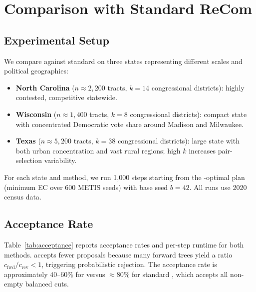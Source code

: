 \section{Comparison with Standard ReCom}
\label{sec:comparison}

\subsection{Experimental Setup}

We compare \fr{} against standard \recom{} on three states representing
different scales and political geographies:
\begin{itemize}
  \item \textbf{North Carolina} ($n \approx 2{,}200$ tracts, $k = 14$
        congressional districts): highly contested, competitive statewide.
  \item \textbf{Wisconsin} ($n \approx 1{,}400$ tracts, $k = 8$
        congressional districts): compact state with concentrated Democratic
        vote share around Madison and Milwaukee.
  \item \textbf{Texas} ($n \approx 5{,}200$ tracts, $k = 38$
        congressional districts): large state with both urban concentration
        and vast rural regions; high $k$ increases pair-selection variability.
\end{itemize}
For each state and method, we run 1{,}000 steps starting from the
\cs{}-optimal plan (minimum EC over 600 METIS seeds) with base seed $b = 42$.
All runs use 2020 census data.

\subsection{Acceptance Rate}

Table~\ref{tab:acceptance} reports acceptance rates and per-step runtime for
both methods.
\fr{} accepts fewer proposals because many forward trees yield a ratio
$c_{\mathrm{fwd}} / c_{\mathrm{rev}} < 1$, triggering probabilistic
rejection.
The acceptance rate is approximately $40$--$60\%$ for \fr{} versus
$\approx\!80\%$ for standard \recom{}, which accepts all non-empty balanced
cuts.

